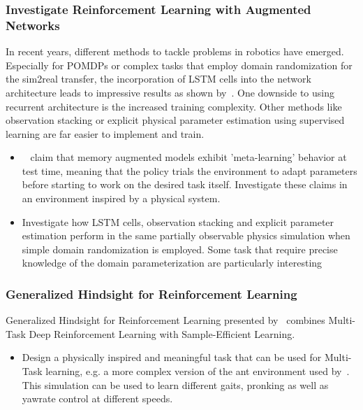 \documentclass[a4paper]{article}
\begin{document}
\subsubsection{Investigate Reinforcement Learning with Augmented Networks}
In recent years, different methods to tackle problems in robotics have emerged. Especially for POMDPs or complex tasks that employ domain randomization for the sim2real transfer, the incorporation of LSTM cells into the network architecture leads to impressive results as shown by~\cite{OpenAI2019}. One downside to using recurrent architecture is the increased training complexity. Other methods like observation stacking or explicit physical parameter estimation using supervised learning are far easier to implement and train.
\begin{itemize}
\item ~\cite{OpenAI2019} claim that memory augmented models exhibit 'meta-learning' behavior at test time, meaning that the policy trials the environment to adapt parameters before starting to work on the desired task itself. Investigate these claims in an environment inspired by a physical system.
\item Investigate how LSTM cells, observation stacking and explicit parameter estimation perform in the same partially observable physics simulation when simple domain randomization is employed. Some task that require precise knowledge of the domain parameterization are particularly interesting
\end{itemize}

\subsubsection{Generalized Hindsight for Reinforcement Learning}
Generalized Hindsight for Reinforcement Learning presented by~\cite{Li2020} combines Multi-Task Deep Reinforcement Learning with Sample-Efficient Learning.
\begin{itemize}
\item Design a physically inspired and meaningful task that can be used for Multi-Task learning, e.g. a more complex version of the ant environment used by~\cite{Li2020}. This simulation can be used to learn different gaits, pronking as well as yawrate control at different speeds.
\end{itemize}
\end{document}
